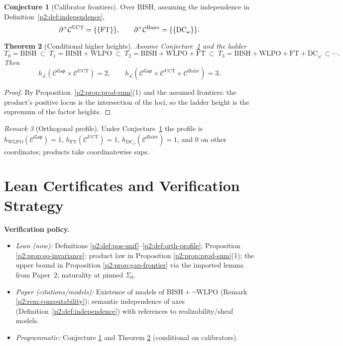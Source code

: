 \documentclass[11pt]{article}
\newtheorem{theorem}{Theorem}[section]
\theoremstyle{definition}
\newtheorem{conjecture}[theorem]{Conjecture}
\theoremstyle{remark}
\newtheorem{remark}[theorem]{Remark}
\newcommand{\WLPO}{\mathrm{WLPO}}
\newcommand{\BISH}{\mathrm{BISH}}
\newcommand{\SigmaZero}{\Sigma_{0}}
\begin{document}
\begin{conjecture}[Calibrator frontiers]\label{p2:conj:calibrators}
Over \(\BISH\), assuming the independence in Definition~\ref{p2:def:independence},
\[
\partial^{+}\mathcal C^{\mathrm{UCT}}=\{\{\mathrm{FT}\}\},\qquad
\partial^{+}\mathcal C^{\mathrm{Baire}}=\{\{\mathrm{DC}_\omega\}\}.
\]
\end{conjecture}

\begin{theorem}[Conditional higher heights]\label{p2:thm:conditional-heights}
Assume Conjecture~\ref{p2:conj:calibrators} and the ladder
\[
T_0=\BISH\ \subset\ T_1=\BISH+\WLPO\ \subset\ T_2=\BISH+\WLPO+\mathrm{FT}\ \subset\
T_3=\BISH+\WLPO+\mathrm{FT}+\mathrm{DC}_\omega\ \subset\cdots.
\]
Then
\[
h_{\mathcal L}\!\left(\mathcal C^{\mathsf{Gap}}\times\mathcal C^{\mathrm{UCT}}\right)=2,\qquad
h_{\mathcal L}\!\left(\mathcal C^{\mathsf{Gap}}\times\mathcal C^{\mathrm{UCT}}\times\mathcal C^{\mathrm{Baire}}\right)=3.
\]
\end{theorem}

\begin{proof}
By Proposition~\ref{p2:prop:prod-sum}(1) and the assumed frontiers: the product’s positive locus is the intersection of the loci, so the ladder height is the supremum of the factor heights.
\end{proof}

\begin{remark}[Orthogonal profile]
Under Conjecture~\ref{p2:conj:calibrators} the profile is
\(h_{\WLPO}(\mathcal C^{\mathsf{Gap}})=1\),
\(h_{\mathrm{FT}}(\mathcal C^{\mathrm{UCT}})=1\),
\(h_{\mathrm{DC}_\omega}(\mathcal C^{\mathrm{Baire}})=1\),
and \(0\) on other coordinates; products take coordinatewise sups.
\end{remark}

\section{Lean Certificates and Verification Strategy}\label{p2:sec:lean}

\begin{mdframed}[style=status]
\textbf{Verification policy.}
\begin{itemize}
\item \emph{Lean (now):} Definitions \ref{p2:def:pos-unif}--\ref{p2:def:orth-profile}; Proposition \ref{p2:prop:eq-invariance}; product law in Proposition \ref{p2:prop:prod-sum}(1); the upper bound in Proposition \ref{p2:prop:gap-frontier} via the imported lemma from Paper~2; naturality at pinned \(\SigmaZero\).
\item \emph{Paper (citations/models):} Existence of models of \(\BISH+\neg\WLPO\) (Remark \ref{p2:rem:computability}); semantic independence of axes (Definition~\ref{p2:def:independence}) with references to realizability/sheaf models.
\item \emph{Programmatic:} Conjecture \ref{p2:conj:calibrators} and Theorem \ref{p2:thm:conditional-heights} (conditional on calibrators).
\end{itemize}
\end{mdframed}
\end{document}
